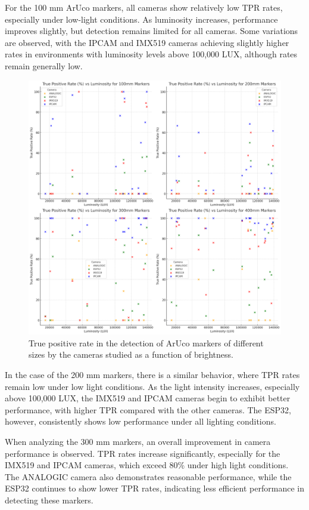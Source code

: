 \documentclass[letterpaper]{article}
\begin{document}
For the 100 mm ArUco markers, all cameras show relatively low TPR rates, especially under low-light conditions. As luminosity increases, performance improves slightly, but detection remains limited for all cameras. Some variations are observed, with the IPCAM and IMX519 cameras achieving slightly higher rates in environments with luminosity levels above 100,000 LUX, although rates remain generally low.

\begin{figure}[H]
\centering
\includegraphics[width=0.8\columnwidth]{images/true_positive_rate2.png}
\caption{True positive rate in the detection of ArUco markers of different sizes by the cameras studied as a function of brightness.}
\label{figure:true_positive_rate}
\end{figure}
In the case of the 200 mm markers, there is a similar behavior, where TPR rates remain low under low light conditions. As the light intensity increases, especially above 100,000 LUX, the IMX519 and IPCAM cameras begin to exhibit better performance, with higher TPR compared with the other cameras. The ESP32, however, consistently shows low performance under all lighting conditions.

When analyzing the 300 mm markers, an overall improvement in camera performance is observed. TPR rates increase significantly, especially for the IMX519 and IPCAM cameras, which exceed 80\% under high light conditions. The ANALOGIC camera also demonstrates reasonable performance, while the ESP32 continues to show lower TPR rates, indicating less efficient performance in detecting these markers.
\end{document}
